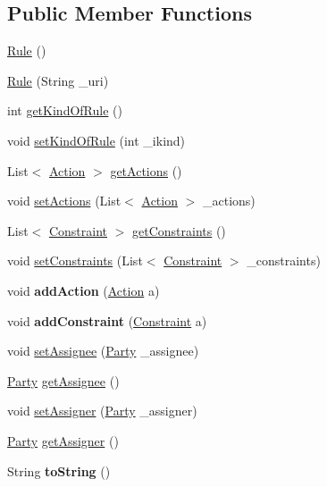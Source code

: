\subsection*{Public Member Functions}
\begin{DoxyCompactItemize}
\item 
\hyperlink{classodrlmodel_1_1_rule_acb4f2244902af08d9785f9456bb8820c}{Rule} ()
\item 
\hyperlink{classodrlmodel_1_1_rule_aaf7c5892139068d9561a50d4089b5bf6}{Rule} (String \-\_\-uri)
\item 
int \hyperlink{classodrlmodel_1_1_rule_a0d71548858ab50049760f914f61a0fc0}{get\-Kind\-Of\-Rule} ()
\item 
void \hyperlink{classodrlmodel_1_1_rule_ab1ff6bd55269f76b974eadfd92b668f8}{set\-Kind\-Of\-Rule} (int \-\_\-ikind)
\item 
List$<$ \hyperlink{classodrlmodel_1_1_action}{Action} $>$ \hyperlink{classodrlmodel_1_1_rule_aa781f875b164590aa2d8bb0bb8d88f94}{get\-Actions} ()
\item 
void \hyperlink{classodrlmodel_1_1_rule_a00027541128650f1f340f29934cebc65}{set\-Actions} (List$<$ \hyperlink{classodrlmodel_1_1_action}{Action} $>$ \-\_\-actions)
\item 
List$<$ \hyperlink{classodrlmodel_1_1_constraint}{Constraint} $>$ \hyperlink{classodrlmodel_1_1_rule_a65f3d362ba59a0c199d19586f3a1e871}{get\-Constraints} ()
\item 
void \hyperlink{classodrlmodel_1_1_rule_a28674bb5d2b9d33e855d3cecabe40fc4}{set\-Constraints} (List$<$ \hyperlink{classodrlmodel_1_1_constraint}{Constraint} $>$ \-\_\-constraints)
\item 
\hypertarget{classodrlmodel_1_1_rule_a30a8615e0a5fdbd4e2e9a43c006cdfa3}{void {\bfseries add\-Action} (\hyperlink{classodrlmodel_1_1_action}{Action} a)}\label{classodrlmodel_1_1_rule_a30a8615e0a5fdbd4e2e9a43c006cdfa3}

\item 
\hypertarget{classodrlmodel_1_1_rule_a9e7455aa5b0217bce0aec60c18986d04}{void {\bfseries add\-Constraint} (\hyperlink{classodrlmodel_1_1_constraint}{Constraint} a)}\label{classodrlmodel_1_1_rule_a9e7455aa5b0217bce0aec60c18986d04}

\item 
void \hyperlink{classodrlmodel_1_1_rule_ac165e23252d5bda726610ab28edede8b}{set\-Assignee} (\hyperlink{classodrlmodel_1_1_party}{Party} \-\_\-assignee)
\item 
\hyperlink{classodrlmodel_1_1_party}{Party} \hyperlink{classodrlmodel_1_1_rule_a10e7f232c1407bef1c5ed455b1261a8f}{get\-Assignee} ()
\item 
void \hyperlink{classodrlmodel_1_1_rule_a3b076086d56ef41f44198d18be14b70a}{set\-Assigner} (\hyperlink{classodrlmodel_1_1_party}{Party} \-\_\-assigner)
\item 
\hyperlink{classodrlmodel_1_1_party}{Party} \hyperlink{classodrlmodel_1_1_rule_a9e227b6b054757b2a88c83c41d619670}{get\-Assigner} ()
\item 
\hypertarget{classodrlmodel_1_1_rule_a4e33d42f26698a5ef54f0c6c652a4ded}{String {\bfseries to\-String} ()}\label{classodrlmodel_1_1_rule_a4e33d42f26698a5ef54f0c6c652a4ded}


\end{DoxyCompactItemize}
